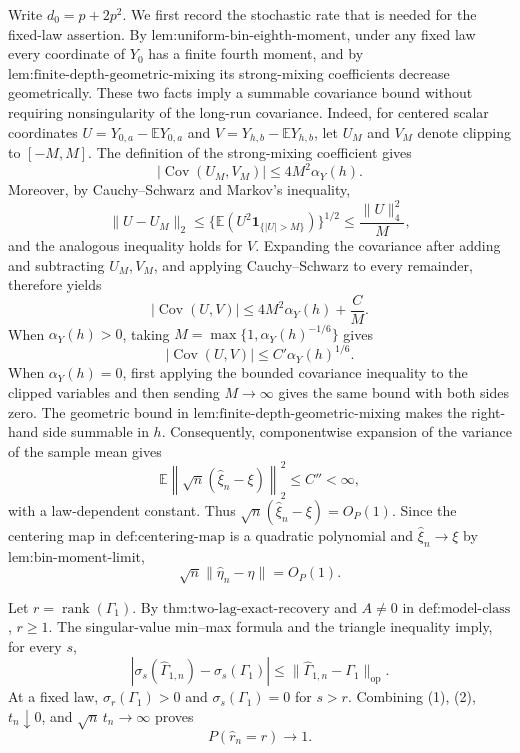 Write \(d_0=p+2p^2\).  We first record the stochastic rate that is needed for the fixed-law assertion.  By \(\text{lem:uniform-bin-eighth-moment}\), under any fixed law every coordinate of \(Y_0\) has a finite fourth moment, and by \(\text{lem:finite-depth-geometric-mixing}\) its strong-mixing coefficients decrease geometrically.  These two facts imply a summable covariance bound without requiring nonsingularity of the long-run covariance.  Indeed, for centered scalar coordinates \(U=Y_{0,a}-\mathbb E Y_{0,a}\) and \(V=Y_{h,b}-\mathbb E Y_{h,b}\), let \(U_M\) and \(V_M\) denote clipping to \([-M,M]\).  The definition of the strong-mixing coefficient gives
\[
 |\operatorname{Cov}(U_M,V_M)|\leq 4M^2\alpha_Y(h).
\]
Moreover, by Cauchy--Schwarz and Markov's inequality,
\[
 \lVert U-U_M\rVert_2
 \leq \{\mathbb E(U^2\mathbf 1_{\{|U|>M\}})\}^{1/2}
 \leq \frac{\lVert U\rVert_4^2}{M},
\]
and the analogous inequality holds for \(V\).  Expanding the covariance after adding and subtracting \(U_M,V_M\), and applying Cauchy--Schwarz to every remainder, therefore yields
\[
 |\operatorname{Cov}(U,V)|
 \leq 4M^2\alpha_Y(h)+\frac{C}{M}.
\]
When \(\alpha_Y(h)>0\), taking \(M=\max\{1,\alpha_Y(h)^{-1/6}\}\) gives
\[
 |\operatorname{Cov}(U,V)|\leq C'\alpha_Y(h)^{1/6}.
\]
When \(\alpha_Y(h)=0\), first applying the bounded covariance inequality to the clipped variables and then sending \(M\to\infty\) gives the same bound with both sides zero.
The geometric bound in \(\text{lem:finite-depth-geometric-mixing}\) makes the right-hand side summable in \(h\).  Consequently, componentwise expansion of the variance of the sample mean gives
\[
 \mathbb E\left\lVert\sqrt n(\widehat\xi_n-\xi)\right\rVert_2^2
 \leq C''<\infty,
\]
with a law-dependent constant.  Thus \(\sqrt n(\widehat\xi_n-\xi)=O_P(1)\).  Since the centering map in \(\text{def:centering-map}\) is a quadratic polynomial and \(\widehat\xi_n\to\xi\) by \(\text{lem:bin-moment-limit}\),
\[
 \sqrt n\lVert\widehat\eta_n-\eta\rVert=O_P(1).
\tag{1}
\]

Let \(r=\operatorname{rank}(\Gamma_1)\).  By \(\text{thm:two-lag-exact-recovery}\) and \(A\neq0\) in \(\text{def:model-class}\), \(r\geq1\).  The singular-value min--max formula and the triangle inequality imply, for every \(s\),
\[
 \left|\sigma_s(\widehat\Gamma_{1,n})-\sigma_s(\Gamma_1)\right|
 \leq\lVert\widehat\Gamma_{1,n}-\Gamma_1\rVert_{\mathrm{op}}.
\tag{2}
\]
At a fixed law, \(\sigma_r(\Gamma_1)>0\) and \(\sigma_s(\Gamma_1)=0\) for \(s>r\).  Combining (1), (2), \(t_n\downarrow0\), and \(\sqrt n\,t_n\to\infty\) proves
\[
 P(\widehat r_n=r)\longrightarrow1.
\tag{3}
\]

